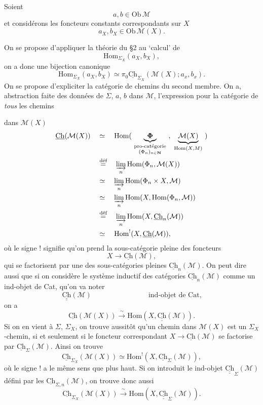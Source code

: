 \documentclass[11pt]{article}
\newcommand{\printedpage}[1]{\marginpar{\footnotesize p.~#1}}
\newcommand{\msp}[1]{\marginpar{\footnotesize [#1]}}
\newcommand{\Hom}{\mathrm{Hom}}
\newcommand{\uCh}{\underline{\mathrm{Ch}}}
\newcommand{\Ch}{\underline{\mathrm{Ch}}}
\newcommand{\cM}{\mathcal{M}}
\newcommand{\Chh}{\underline{\underline{\mathrm{Ch}}}}
\newcommand{\dfeq}{\overset{\text{déf}}{=}}
\begin{document}
Soient
\[
a, b \in \mathrm{Ob}\,\mathcal{M}
\]
et considérons les foncteurs constants correspondants sur $X$
\[
a_X, b_X \in \mathrm{Ob}\,\mathcal{M}(X).
\]

\msp{page 29}On se propose d'appliquer la théorie du \S2 au `calcul' de
\[
\Hom_{\Sigma_X}(a_X, b_X),
\]
on a donc une bijection canonique
\[
\boxed{\Hom_{\Sigma_X}(a_X, b_X) \simeq \pi_0\uCh_{\Sigma_X}(\mathcal{M}(X); a_x, b_x).} %
\]
On se propose d'expliciter la catégorie de chemins du second membre. On a, abstraction faite des données de $\Sigma$, $a$, $b$ dans $\mathcal{M}$, l'expression pour la catégorie de \textit{tous} les chemins

\printedpage{19}

dans $\cM(X)$
\[
\begin{aligned}
\Ch(\cM(X)) \quad &\simeq \quad \Hom(\ \underbrace{\boldsymbol{\Phi}}_{\substack{\text{pro-catégorie}\\ (\Phi_n)_{n\in\mathbf{N}}}}\ ,\ \underbrace{\cM(X)}_{\Hom(X,M)}\ ) \\ %
&\dfeq \quad \varinjlim_n \Hom(\Phi_n,\cM(X)) \\
&\simeq \quad \varinjlim_n \Hom(\Phi_n\times X,\cM) \\
&\simeq \quad \varinjlim_n \Hom(X,\Hom(\Phi_n,\cM)) \\
&\dfeq \quad \varinjlim_n \Hom(X,\Ch_n(\cM)) \\
&\simeq \quad \Hom^{!}(X,\Ch(\cM)),
\end{aligned}
\]
où le signe ! signifie qu'on prend la sous-catégorie pleine des foncteurs
\[
X\longrightarrow \Ch(\cM),
\]
\msp{page 30}
qui se factorisent par une des sous-catégories pleines $\Ch_n(\cM)$. On peut dire aussi que si on considère le système inductif des catégories $\Ch_n(\cM)$ comme un ind-objet de Cat, qu'on va noter
\[
\Chh(\cM) \qquad\qquad\qquad\qquad \text{ind-objet de Cat,}
\]
on a
\[
\Ch(\cM(X)) \xrightarrow{\ \sim\ } \Hom(X,\Chh(\cM)).
\]
Si on en vient à $\Sigma$, $\Sigma_X$, on trouve aussitôt qu'un chemin dans $\cM(X)$ est un $\Sigma_X$-chemin, si et seulement si le foncteur correspondant $X\longrightarrow\Ch(\cM)$ se factorise par $\Ch_{\Sigma}(\cM)$. Ainsi on trouve
\[
\Ch_{\Sigma_X}(\cM(X))\simeq\Hom^{!}(X,\Ch_{\Sigma}(\cM)),
\]
où le signe ! a le même sens que plus haut. Si on introduit le ind-objet $\Chh_{\Sigma}(\cM)$ défini par les $\Ch_{\Sigma,n}(\cM)$, on trouve donc aussi
\[
\Ch_{\Sigma_X}(\cM(X))\xrightarrow{\ \sim\ }\Hom(X,\Chh_{\Sigma}(\cM)).
\]
\end{document}
